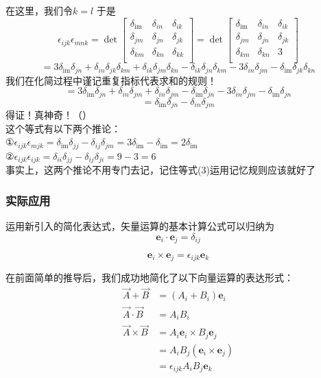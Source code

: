 \documentclass{article}
\newcommand{\ve}{\boldsymbol}
\begin{document}
\begin{CJK}{UTF8}{gkai}
在这里，我们令$k=l$
于是\[\epsilon_{ijk}\epsilon_{mnk}=
\det
\begin{bmatrix}
    \delta_{\text{im}}&\delta_{in}&\delta_{ik}\\    
    \delta_{jm}&\delta_{jn}&\delta_{jk}\\
    \delta_{km}&\delta_{kn}&\delta_{kk}\\
\end{bmatrix}
=
\det
\begin{bmatrix}
    \delta_{\text{im}}&\delta_{in}&\delta_{ik}\\    
    \delta_{jm}&\delta_{jn}&\delta_{jk}\\
    \delta_{km}&\delta_{kn}&3\\
\end{bmatrix}\]
\[=3\delta_{\text{im}}\delta_{jn}+\delta_{in}\delta_{jk}\delta_{km}+\delta_{ik}\delta_{jm}\delta_{kn}-\delta_{ik}\delta_{jn}\delta_{km}-3\delta_{in}\delta_{jm}-\delta_{\text{im}}\delta_{jk}\delta_{kn}
\]
我们在化简过程中谨记重复指标代表求和的规则！
\[=3\delta_{\text{im}}\delta_{jn}+\delta_{in}\delta_{jm}+\delta_{in}\delta_{jm}-\delta_{\text{im}}\delta_{jn}-3\delta_{in}\delta_{jm}-\delta_{\text{im}}\delta_{jn}
\]
\[=\delta_{\text{im}}\delta_{jn}-\delta_{in}\delta_{jm}\]
得证！真神奇！（）\\

这个等式有以下两个推论：\\

①$\epsilon_{ijk}\epsilon_{mjk}=\delta_{\text{im}}\delta_{jj}-\delta_{ij}\delta_{jm}=3\delta_{\text{im}}-\delta_{\text{im}}=2\delta_{\text{im}}$\\

②$\epsilon_{ijk}\epsilon_{ijk}=\delta_{ii}\delta_{jj}-\delta_{ij}\delta_{ji}=9-3=6$\\

事实上，这两个推论不用专门去记，记住等式(3)运用记忆规则应该就好了\\

\subsubsection*{实际应用}
运用新引入的简化表达式，矢量运算的基本计算公式可以归纳为
\[\ve{e}_i\cdot \ve{e}_j=\delta_{ij}\]

\[\ve{e}_i\times \ve{e}_j=\epsilon_{ijk}\ve{e}_k\]

在前面简单的推导后，我们成功地简化了以下向量运算的表达形式：\\

\[
\begin{aligned}    
\overrightarrow{A}+ \overrightarrow{B}&=(A_i+B_i)\ve{e}_i\\
\overrightarrow{A}\cdot \overrightarrow{B}&=A_i B_i\\
\overrightarrow{A}\times \overrightarrow{B}&=A_i\ve{e}_i\times B_j\ve{e}_j\\
&=A_i B_j(\ve{e}_i\times \ve{e}_j)\\
&=\epsilon_{ijk}A_i B_j\ve{e}_k
\end{aligned}
\]


\end{CJK}
\end{document}
